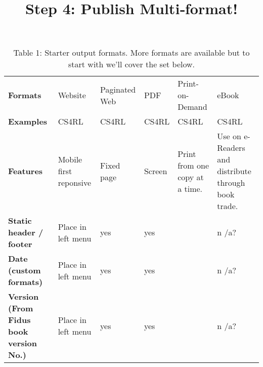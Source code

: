 \documentclass{article}
\begin{document}
\title{Step 4: Publish Multi‑format!}

\maketitle

\begin{table}
\caption*{Table 1: Starter output formats. More formats are available but to start with we'll cover the set below.}\label{T63104901}

\begin{tabu} to \textwidth { |X|X|X|X|X|X| }
\hline



\textbf{Formats} & Website & Paginated Web & PDF & Print-on-Demand & eBook
 \\


\textbf{Examples} & CS4RL & CS4RL & CS4RL & CS4RL & CS4RL
 \\


\textbf{Features} & Mobile first reponsive & Fixed page & Screen & Print from one copy at a time.  & Use on e-Readers and distribute through book trade.
 \\


\textbf{Static header / footer} & Place in left menu & yes & yes &  & n /a?
 \\


\textbf{Date (custom formats)} & Place in left menu & yes & yes &  & n /a?
 \\


\textbf{Version (From Fidus book version No.)} & Place in left menu & yes & yes &  & n /a?
 \\
\hline

\end{tabu}\end{table}
\end{document}
